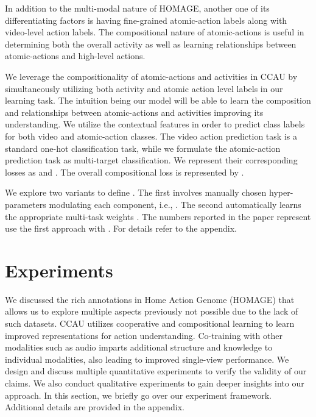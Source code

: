 \documentclass[final]{cvpr}
\begin{document}
In addition to the multi-modal nature of HOMAGE, another one of its differentiating factors is having fine-grained atomic-action labels along with video-level action labels. The compositional nature of atomic-actions is useful in determining both the overall activity as well as learning relationships between atomic-actions and high-level actions.

We leverage the compositionality of atomic-actions and activities in CCAU by simultaneously utilizing both activity and atomic action level labels in our learning task. The intuition being our model will be able to learn the composition and relationships between atomic-actions and activities improving its understanding. We utilize the contextual features  in order to predict class labels for both video and atomic-action classes. The video action prediction task is a standard one-hot classification task, while we formulate the atomic-action prediction task as multi-target classification. We represent their corresponding losses as  and . The overall compositional loss is represented by .

We explore two variants to define . The first involves manually chosen hyper-parameters modulating each component, i.e., . The second automatically learns the appropriate multi-task weights \cite{kendall2018multi}. The numbers reported in the paper represent use the first approach with . For details refer to the appendix.








    

\section{Experiments}

We discussed the rich annotations in Home Action Genome (HOMAGE) that allows us to explore multiple aspects previously not possible due to the lack of such datasets. CCAU utilizes cooperative and compositional learning to learn improved representations for action understanding. Co-training with other modalities such as audio imparts additional structure and knowledge to individual modalities, also leading to improved single-view performance. We design and discuss multiple quantitative experiments to verify the validity of our claims. We also conduct qualitative experiments to gain deeper insights into our approach. In this section, we briefly go over our experiment framework. Additional details are provided in the appendix.
\end{document}
